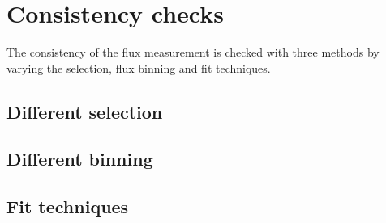 \section{Consistency checks}
The consistency of the flux measurement is checked with three methods by varying the selection, flux binning and fit techniques.
\subsection{Different selection}
\subsection{Different binning}
\subsection{Fit techniques}